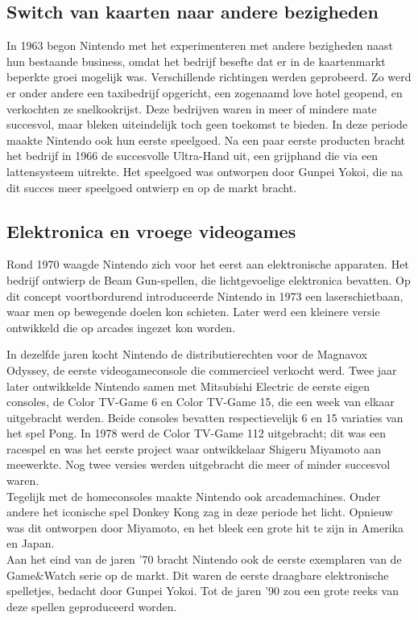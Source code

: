 \documentclass{article}
\begin{document}
\subsection{Switch van kaarten naar andere bezigheden}
In 1963 begon Nintendo met het experimenteren met andere bezigheden naast hun bestaande business, omdat het bedrijf besefte dat er in de kaartenmarkt beperkte groei mogelijk was. Verschillende richtingen werden geprobeerd. Zo werd er onder andere een taxibedrijf opgericht, een zogenaamd love hotel geopend, en verkochten ze snelkookrijst. Deze bedrijven waren in meer of mindere mate succesvol, maar bleken uiteindelijk toch geen toekomst te bieden. 
In deze periode maakte Nintendo ook hun eerste speelgoed. Na een paar eerste producten bracht het bedrijf in 1966 de succesvolle Ultra-Hand uit, een grijphand die via een lattensysteem uitrekte. Het speelgoed was ontworpen door Gunpei Yokoi, die na dit succes meer speelgoed ontwierp en op de markt bracht.


\subsection{Elektronica en vroege videogames}
Rond 1970 waagde Nintendo zich voor het eerst aan elektronische apparaten. Het bedrijf ontwierp de Beam Gun-spellen, die lichtgevoelige elektronica bevatten. Op dit concept voortbordurend introduceerde Nintendo in 1973 een laserschietbaan, waar men op bewegende doelen kon schieten. Later werd een kleinere versie ontwikkeld die op arcades ingezet kon worden.

In dezelfde jaren kocht Nintendo de distributierechten voor de Magnavox Odyssey, de eerste videogameconsole die commercieel verkocht werd. Twee jaar later ontwikkelde Nintendo samen met Mitsubishi Electric de eerste eigen consoles, de Color TV-Game 6 en Color TV-Game 15, die een week van elkaar uitgebracht werden. Beide consoles bevatten respectievelijk 6 en 15 variaties van het spel Pong. In 1978 werd de Color TV-Game 112 uitgebracht; dit was een racespel en was het eerste project waar ontwikkelaar Shigeru Miyamoto aan meewerkte. Nog twee versies werden uitgebracht die meer of minder succesvol waren. 
\\ 
Tegelijk met de homeconsoles maakte Nintendo ook arcademachines. Onder andere het iconische spel Donkey Kong zag in deze periode het licht. Opnieuw was dit ontworpen door Miyamoto, en het bleek een grote hit te zijn in Amerika en Japan.
\\ 
Aan het eind van de jaren '70 bracht Nintendo ook de eerste exemplaren van de Game\&Watch serie op de markt. Dit waren de eerste draagbare elektronische spelletjes, bedacht door Gunpei Yokoi. Tot de jaren '90 zou een grote reeks van deze spellen geproduceerd worden.
\end{document}
